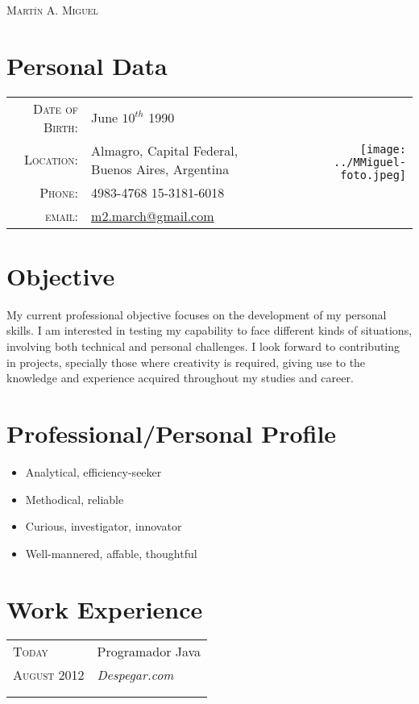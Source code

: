 \documentclass[a4paper,10pt]{article}
\newcommand{\workEntry}[5]{
\begin{tabular}{p{1.7cm}|p{11cm}}
\raggedleft \textsc{#1} & #3 \\
\raggedleft \textsc{#2} & \emph{#4} \\
& \footnotesize{#5}\\
\multicolumn{2}{c}{}\ %
\end{tabular}
}
\begin{document}
\par{\centering
{\huge{\textsc{Mart\'in A. Miguel}} }
\bigskip\par}

\section{Personal Data}
\begin{tabular}[c]{rp{7.5cm}r}
\textsc{Date of Birth:} & June $10^{th}$ 1990 & \multirow{4}{*}{\texttt{[image: ../MMiguel-foto.jpeg]}}\\
\textsc{Location:}	& Almagro, Capital Federal, \newline Buenos Aires, Argentina & \\
\textsc{Phone:}	& 4983-4768 15-3181-6018 & \\
\textsc{email:}	& \href{mailto:m2.march@gmail.com}{m2.march@gmail.com} & \\

\end{tabular}

\section{Objective}
My current professional objective focuses on the development of my personal skills. I am interested in testing my capability to face different kinds of situations, involving both technical and personal challenges. I look forward to contributing in projects, specially those where creativity is required, giving use to the knowledge and experience acquired throughout my studies and career.

\section{Professional/Personal Profile}
\begin{itemize}
 \item Analytical, efficiency-seeker
 \item Methodical, reliable 
 \item Curious, investigator, innovator
 \item Well-mannered, affable, thoughtful
\end{itemize}

\section{Work Experience}
\workEntry{Today}{August 2012}{Programador Java}{Despegar.com}{}
\end{document}
